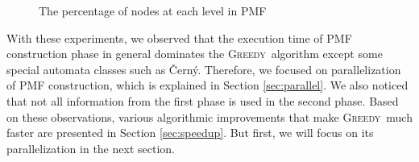\documentclass[12pt]{article}
\newcommand{\greedyAlgo}{\textsc{Greedy}}
\begin{document}
\begin{figure}[ht]
	\centering
	\caption{The percentage of nodes at each level in PMF}
	\label{fig:nodes-at-levels}
\end{figure}


With these experiments, we observed that the execution time of PMF construction phase in general dominates the \greedyAlgo\ algorithm except some special automata classes such as \v{C}ern\'y. Therefore, we focused on parallelization of PMF construction, which is explained in Section \ref{sec:parallel}. We also noticed that not all information from the first phase is used in the second phase. Based on these observations, various algorithmic improvements that make \greedyAlgo\  much faster are presented in Section \ref{sec:speedup}. But first, we will focus on its parallelization in the next section.
\end{document}
